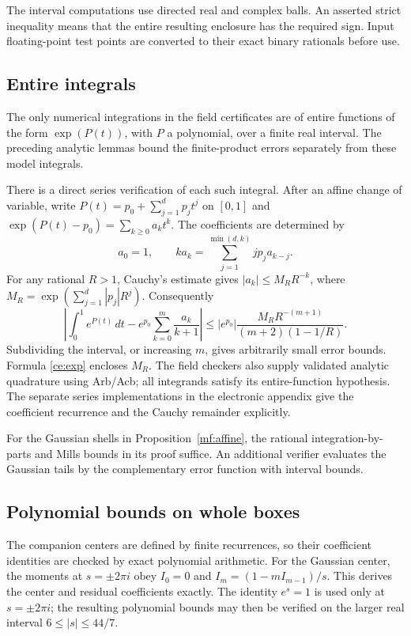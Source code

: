 The interval computations use directed real and complex balls.
An asserted strict inequality means that the entire resulting
enclosure has the required sign. Input floating-point test points are converted to
their exact binary rationals before use.

\subsection{Entire integrals}

The only numerical integrations in the field certificates are of
entire functions of the form $\exp(P(t))$, with $P$ a polynomial,
over a finite real interval. The preceding analytic lemmas bound the
finite-product errors separately from these model integrals.

There is a direct series verification of each such integral. After
an affine change of variable, write
$P(t)=p_0+\sum_{j=1}^d p_jt^j$ on $[0,1]$ and
$\exp(P(t)-p_0)=\sum_{k\ge0}a_kt^k$.
The coefficients are determined by
\[
 a_0=1,\qquad
 ka_k=\sum_{j=1}^{\min(d,k)}jp_ja_{k-j}.
\]
For any rational $R>1$, Cauchy's estimate gives
$|a_k|\le M_RR^{-k}$, where
$M_R=\exp(\sum_{j=1}^d|p_j|R^j)$.
Consequently
\[
 \left|\int_0^1e^{P(t)}\,dt
       -e^{p_0}\sum_{k=0}^{m}\frac{a_k}{k+1}\right|
 \le |e^{p_0}|
       \frac{M_RR^{-(m+1)}}{(m+2)(1-1/R)}.
\]
Subdividing the interval, or increasing $m$, gives arbitrarily
small error bounds. Formula \eqref{ce:exp} encloses $M_R$.
The field checkers also supply validated analytic quadrature
using Arb/Acb; all integrands satisfy its entire-function
hypothesis. The separate series implementations in the
electronic appendix give the coefficient recurrence and the
Cauchy remainder explicitly.

For the Gaussian shells in Proposition~\ref{mf:affine}, the rational
integration-by-parts and Mills bounds in its proof suffice.
An additional verifier evaluates the Gaussian tails by the
complementary error function with interval bounds.

\subsection{Polynomial bounds on whole boxes}

The companion centers are defined by finite recurrences, so their
coefficient identities are checked by exact polynomial arithmetic.
For the Gaussian center, the moments
at $s=\pm2\pi i$ obey $I_0=0$ and
$I_m=(1-mI_{m-1})/s$. This derives the center and residual
coefficients exactly. The identity $e^s=1$ is used only at
$s=\pm2\pi i$; the resulting polynomial bounds may then be
verified on the larger real interval $6\le |s|\le44/7$.

